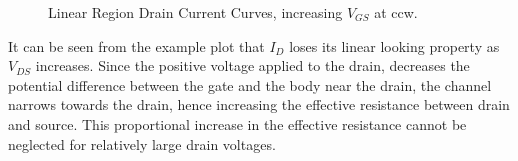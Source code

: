 \documentclass[../main.tex]{subfiles}
\begin{document}
    \begin{figure}[H] \centering
        \caption{Linear Region Drain Current Curves, increasing $V_{GS}$ at ccw.}\label{cclin}
    \end{figure}

    It can be seen from the example plot that $I_D$ loses its linear looking property as $V_{DS}$ increases. Since 
    the positive voltage applied to the drain, decreases the potential difference between the gate and the body near the 
    drain, the channel narrows towards the drain, hence increasing the effective resistance between drain and source.
    This proportional increase in the effective resistance cannot be neglected for relatively large drain voltages.
\end{document}
